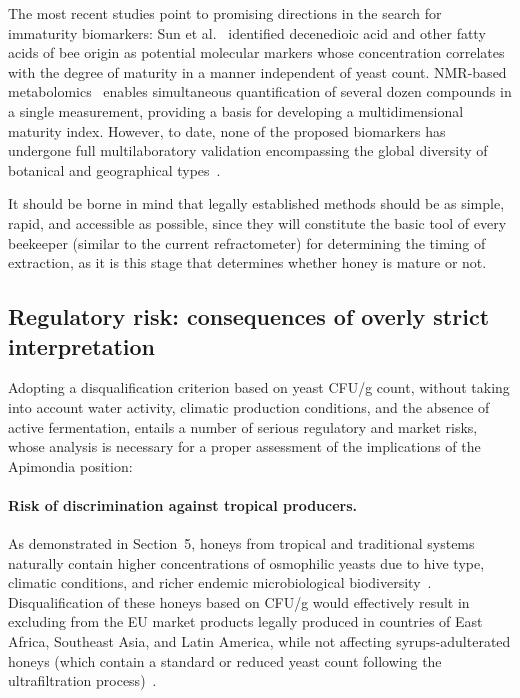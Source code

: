 The most recent studies point to promising directions in the search
for immaturity biomarkers: Sun et al.~\cite{sun2021} identified
decenedioic acid and other fatty acids of bee origin as potential
molecular markers whose concentration correlates with the degree of
maturity in a manner independent of yeast count. NMR-based
metabolomics~\cite{nmrhoney2023} enables simultaneous quantification
of several dozen compounds in a single measurement, providing
a basis for developing a multidimensional maturity index. However,
to date, none of the proposed biomarkers has undergone full
multilaboratory validation encompassing the global diversity of
botanical and geographical types~\cite{tsagkaris2021}.

It should be borne in mind that legally established methods should
be as simple, rapid, and accessible as possible, since they will
constitute the basic tool of every beekeeper (similar to the current
refractometer) for determining the timing of extraction, as it is
this stage that determines whether honey is mature or not.

\subsection{Regulatory risk: consequences of overly strict interpretation}

Adopting a disqualification criterion based on yeast CFU/g count,
without taking into account water activity, climatic production
conditions, and the absence of active fermentation, entails a number
of serious regulatory and market risks, whose analysis is necessary
for a proper assessment of the implications of the Apimondia
position:

\paragraph{Risk of discrimination against tropical producers.}
As demonstrated in Section~5, honeys from tropical and traditional
systems naturally contain higher concentrations of osmophilic yeasts
due to hive type, climatic conditions, and richer endemic
microbiological
biodiversity~\cite{tadele2025,stinglessyeastbrazil2021}.
Disqualification of these honeys based on CFU/g would effectively
result in excluding from the EU market products legally produced
in countries of East Africa, Southeast Asia, and Latin America,
while not affecting syrups-adulterated honeys (which contain a
standard or reduced yeast count following the ultrafiltration
process)~\cite{eufromhives2021}.

